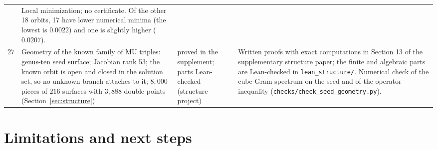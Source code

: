 \documentclass[11pt]{article}
\theoremstyle{definition}
\theoremstyle{remark}
\begin{document}
{\begin{longtable}{@{}p{}>{\raggedright\arraybackslash}p{}>{\raggedright\arraybackslash}p{}>{\raggedright\arraybackslash}p{}@{}}
  & Local minimization; no certificate. Of the other 18 orbits, 17 have lower numerical minima (the lowest
  is $0.0022$) and one is slightly higher ($0.0207$).\\
27 & Geometry of the known family of MU triples: genus-ten seed surface; Jacobian rank 53; the known orbit is open
  and closed in the solution set, so no unknown branch attaches to it; $8{,}000$ pieces of $216$ surfaces with
  $3{,}888$ double points (Section~\ref{sec:structure}) & proved in the supplement; parts Lean-checked (structure project) & Written proofs with exact computations in
  Section 13 of the supplementary structure paper; the finite and algebraic parts are Lean-checked in \texttt{lean\_structure/}.
  Numerical check of the cube-Gram spectrum on the seed and of the operator inequality (\texttt{checks/}\allowbreak\texttt{check\_seed\_geometry.py}).\\
\end{longtable}
}

\section{Limitations and next steps}\label{sec:limits}
\end{document}
